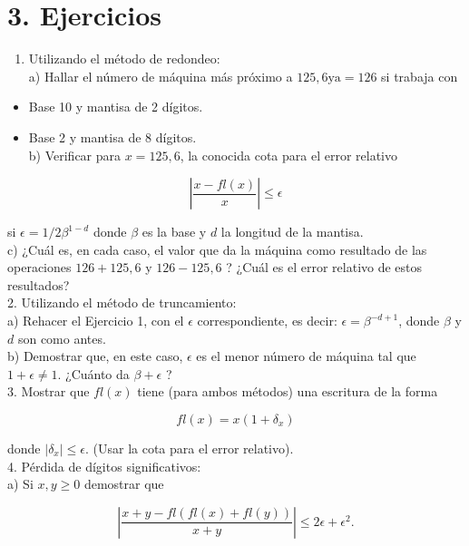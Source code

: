 \documentclass[10pt]{article}
\begin{document}
\section*{3. Ejercicios}
\begin{enumerate}
  \item Utilizando el método de redondeo:\\
a) Hallar el número de máquina más próximo a $125,6 \mathrm{y} \mathrm{a}=126$ si trabaja con
\end{enumerate}

\begin{itemize}
  \item Base 10 y mantisa de 2 dígitos.
  \item Base 2 y mantisa de 8 dígitos.\\
b) Verificar para $x=125,6$, la conocida cota para el error relativo
\end{itemize}

$$
\left|\frac{x-f l(x)}{x}\right| \leq \epsilon
$$

si $\epsilon=1 / 2 \beta^{1-d}$ donde $\beta$ es la base y $d$ la longitud de la mantisa.\\
c) ¿Cuál es, en cada caso, el valor que da la máquina como resultado de las operaciones $126+125,6$ y $126-125,6$ ? ¿Cuál es el error relativo de estos resultados?\\
2. Utilizando el método de truncamiento:\\
a) Rehacer el Ejercicio 1, con el $\epsilon$ correspondiente, es decir: $\epsilon=\beta^{-d+1}$, donde $\beta$ y $d$ son como antes.\\
b) Demostrar que, en este caso, $\epsilon$ es el menor número de máquina tal que $1+\epsilon \neq 1$. ¿Cuánto da $\beta+\epsilon$ ?\\
3. Mostrar que $f l(x)$ tiene (para ambos métodos) una escritura de la forma

$$
f l(x)=x\left(1+\delta_{x}\right)
$$

donde $\left|\delta_{x}\right| \leq \epsilon$. (Usar la cota para el error relativo).\\
4. Pérdida de dígitos significativos:\\
a) Si $x, y \geq 0$ demostrar que

$$
\left|\frac{x+y-f l(f l(x)+f l(y))}{x+y}\right| \leq 2 \epsilon+\epsilon^{2} .
$$
\end{document}
